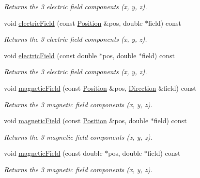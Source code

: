 \begin{DoxyCompactItemize}
\begin{DoxyCompactList}\small\item\em Returns the 3 electric field components (x, y, z). \end{DoxyCompactList}\item 
void \hyperlink{class_d_d4hep_1_1_geometry_1_1_overlayed_field_a32a1173bdf2c6770f0d43ffb1e3d3bc5}{electric\+Field} (const \hyperlink{namespace_d_d4hep_1_1_geometry_a55083902099d03506c6db01b80404900}{Position} \&pos, double $\ast$field) const
\begin{DoxyCompactList}\small\item\em Returns the 3 electric field components (x, y, z). \end{DoxyCompactList}\item 
void \hyperlink{class_d_d4hep_1_1_geometry_1_1_overlayed_field_aab3125e34e32d2440850b3a78c0b7a03}{electric\+Field} (const double $\ast$pos, double $\ast$field) const
\begin{DoxyCompactList}\small\item\em Returns the 3 electric field components (x, y, z). \end{DoxyCompactList}\item 
void \hyperlink{class_d_d4hep_1_1_geometry_1_1_overlayed_field_aa89c3f5aa4ab97881e0d9c68c9eeff62}{magnetic\+Field} (const \hyperlink{namespace_d_d4hep_1_1_geometry_a55083902099d03506c6db01b80404900}{Position} \&pos, \hyperlink{namespace_d_d4hep_1_1_geometry_a56730a0ddb9f3f089c415cd693bd7c19}{Direction} \&field) const
\begin{DoxyCompactList}\small\item\em Returns the 3 magnetic field components (x, y, z). \end{DoxyCompactList}\item 
void \hyperlink{class_d_d4hep_1_1_geometry_1_1_overlayed_field_a6987ef7388a5888d762a08ef0dd64a0f}{magnetic\+Field} (const \hyperlink{namespace_d_d4hep_1_1_geometry_a55083902099d03506c6db01b80404900}{Position} \&pos, double $\ast$field) const
\begin{DoxyCompactList}\small\item\em Returns the 3 magnetic field components (x, y, z). \end{DoxyCompactList}\item 
void \hyperlink{class_d_d4hep_1_1_geometry_1_1_overlayed_field_ad7d30b090019e3147927dd4804a5f701}{magnetic\+Field} (const double $\ast$pos, double $\ast$field) const
\begin{DoxyCompactList}\small\item\em Returns the 3 magnetic field components (x, y, z). \end{DoxyCompactList}\item 

\end{DoxyCompactItemize}
